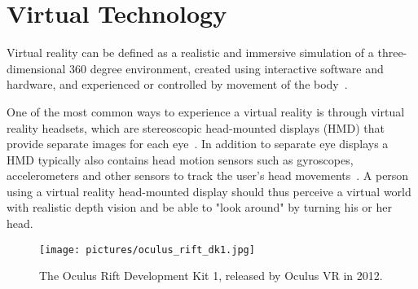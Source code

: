 
\section{Virtual Technology}
Virtual reality can be defined as a realistic and immersive simulation of a three-dimensional 360 degree environment, 
created using interactive software and hardware, and experienced or controlled by movement of the body~\citep{VRS2016}.

One of the most common ways to experience a virtual reality is through virtual reality headsets, which are stereoscopic head-mounted displays (HMD) 
that provide separate images for each eye~\citep{POLYGON2016}. 
In addition to separate eye displays a HMD typically also contains head motion sensors such as gyroscopes, accelerometers 
and other sensors to track the user's head movements~\citep{TW2016}. 
A person using a virtual reality head-mounted display should thus perceive a virtual world with realistic depth vision and be able to "look around" 
by turning his or her head.


\begin{figure}%
	\texttt{[image: pictures/oculus\_rift\_dk1.jpg]}
	\caption[The Oculus Rift Development Kit 1]{The Oculus Rift Development Kit 1, released by Oculus VR in 2012.}
	\label{fig:oculus}
\end{figure}


